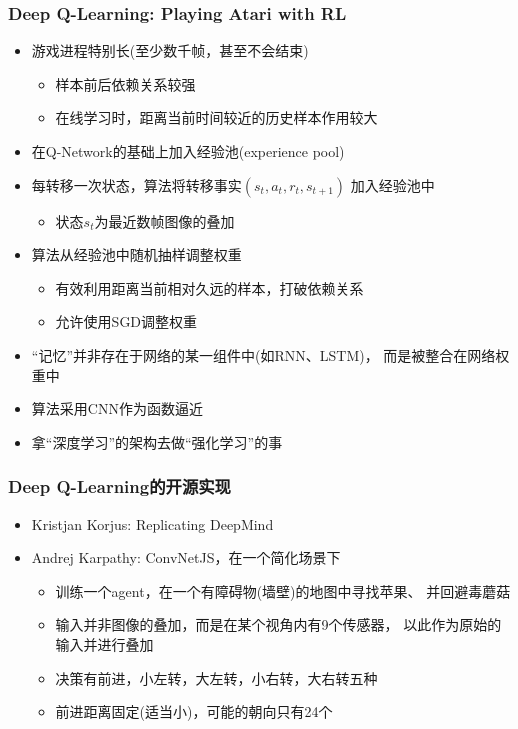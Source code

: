 \documentclass[10pt,CJK]{beamer}
\begin{document}
	\begin{frame}
		\frametitle{Deep Q-Learning: Playing Atari with RL}
		\begin{itemize}
			\item 游戏进程特别长(至少数千帧，甚至不会结束)
			\begin{itemize}
				\item 样本前后依赖关系较强
				\item 在线学习时，距离当前时间较近的历史样本作用较大
			\end{itemize}\pause
			\item 在Q-Network的基础上加入\alert{经验池}(experience pool)
			\pause
			\item 每转移一次状态，算法将转移事实$(s_t,a_t,r_t,s_{t+1})$
			加入经验池中
			\begin{itemize}
				\item 状态$s_t$为最近数帧图像的叠加
			\end{itemize}\pause
			\item 算法从经验池中随机抽样调整权重
			\begin{itemize}
				\item 有效利用距离当前相对久远的样本，打破依赖关系
				\item 允许使用SGD调整权重
			\end{itemize}\pause
			\item “记忆”并非存在于网络的某一组件中(如RNN、LSTM)，
			而是被整合在网络权重中\pause
			\item 算法采用CNN作为函数逼近\pause
			\item 拿“深度学习”的架构去做“强化学习”的事
		\end{itemize}
	\end{frame}
	
	\begin{frame}
		\frametitle{Deep Q-Learning的开源实现}
		\begin{itemize}
			\item Kristjan Korjus: Replicating DeepMind
			\item Andrej Karpathy: ConvNetJS，在一个简化场景下\pause
			\begin{itemize}
				\item 训练一个agent，在一个有障碍物(墙壁)的地图中寻找苹果、
				并回避毒蘑菇
				\item 输入并非图像的叠加，而是在某个视角内有9个传感器，
				以此作为原始的输入并进行叠加
				\item 决策有前进，小左转，大左转，小右转，大右转五种
				\item 前进距离固定(适当小)，可能的朝向只有24个
			\end{itemize}
		\end{itemize}
	\end{frame}
	
\end{document}
